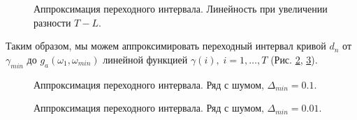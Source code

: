 \documentclass[specialist, substylefile = spbu.rtx,
			   subf, href, 12pt]{disser}
\begin{document}
\begin{figure}[!hhh]
	\caption{Аппроксимация переходного интервала. Линейность при увеличении разности $ T-L $.}
	\label{pic:row_linear_growth}
\end{figure}


Таким образом, мы можем аппроксимировать переходный интервал кривой $ d_n $ от $ \gamma_{min} $ до $ g_a(\omega_1, \omega_{min}) $ линейной функцией $ \gamma(i),\; i=1, \dots, T $ (Рис. \ref{pic:row_linear_approximation_1}, \ref{pic:row_linear_approximation_2}).

\begin{figure}[!hhh]
	\caption{Аппроксимация переходного интервала. Ряд с шумом, $ \Delta_{min} = 0.1 $.}
	\label{pic:row_linear_approximation_1}
\end{figure}

\begin{figure}[!hhh]
	\caption{Аппроксимация переходного интервала. Ряд с шумом, $ \Delta_{min} = 0.01 $.}
	\label{pic:row_linear_approximation_2}
\end{figure}
\end{document}
